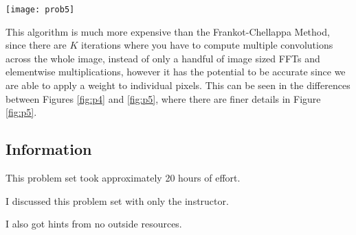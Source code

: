 \documentclass{article}
\newcommand{\info}{\clearpage \subsection*{Information}}
\begin{document}
\begin{figure*}[!h]
	\centering
	\texttt{[image: prob5]}
	\caption{Depth Map from Conjugate Gradient Method}
	\label{fig:p5}
\end{figure*}

This algorithm is much more expensive than the Frankot-Chellappa Method, since there are $K$ iterations where you have to compute multiple convolutions across the whole image, instead of only a handful of image sized FFTs and elementwise multiplications, however it has the potential to be accurate since we are able to apply a weight to individual pixels. This can be seen in the differences between Figures \ref{fig:p4} and \ref{fig:p5}, where there are finer details in Figure \ref{fig:p5}.

\info

This problem set took approximately 20 hours of effort.

I discussed this problem set with only the instructor.

I also got hints from no outside resources. 
\end{document}
